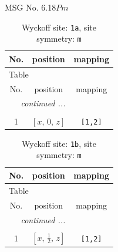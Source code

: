 \documentclass[fleqn,8pt]{jsarticle}
\begin{document}
\setcounter{MaxMatrixCols}{32}

\renewcommand{\tablename}{Table~}
\renewcommand{\figurename}{Figure~}
\begin{center}
\LARGE
MSG No. 6.18\quad$Pm$
\end{center}
\renewcommand{\arraystretch}{1.2}
\begin{longtable}{ccc}
\caption{Wyckoff site: {\tt 1a}, site symmetry: {\tt m}}
 \\
 \hline \hline
No. & position & mapping \\ \hline \endfirsthead

\multicolumn{2}{l}{\tablename\ \thetable{}} \\
 \hline \hline
No. & position & mapping \\ \hline \endhead

 \hline \hline
\multicolumn{2}{r}{\footnotesize\it continued ...} \\ \endfoot

 \hline \hline
\multicolumn{2}{r}{} \\ \endlastfoot

1 & $\left[ x,\, 0,\, z \right]$ & {\tt [1,2]} \\
\end{longtable}
\renewcommand{\arraystretch}{1.2}
\begin{longtable}{ccc}
\caption{Wyckoff site: {\tt 1b}, site symmetry: {\tt m}}
 \\
 \hline \hline
No. & position & mapping \\ \hline \endfirsthead

\multicolumn{2}{l}{\tablename\ \thetable{}} \\
 \hline \hline
No. & position & mapping \\ \hline \endhead

 \hline \hline
\multicolumn{2}{r}{\footnotesize\it continued ...} \\ \endfoot

 \hline \hline
\multicolumn{2}{r}{} \\ \endlastfoot

1 & $\left[ x,\, \frac{1}{2},\, z \right]$ & {\tt [1,2]} \\
\end{longtable}
\renewcommand{\arraystretch}{1.2}
\end{document}
